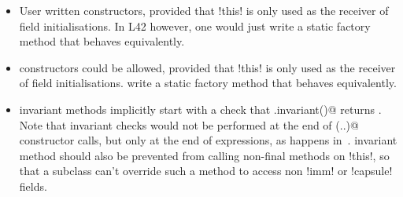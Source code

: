 \begin{itemize}
	\item User written constructors, provided that \Q!this! is only used as the receiver of field initialisations. In L42 however, one would just write a static factory method that behaves equivalently.
	\item {}  constructors could be allowed, provided that \Q!this! is only used as the receiver of field initialisations.   write a static factory method that behaves equivalently.
	\item {} invariant methods   implicitly start with a check that \Q@super.invariant()@ returns \Q@true@. Note that invariant checks would not be performed at the end of \Q@super(..)@ constructor calls, but only at the end of \Q@new@ expressions, as happens in~\cite{feldman2006jose}.  invariant method should also be prevented from calling non-final methods on \Q!this!, so that a subclass can't override such a method to access non \Q!imm! or \Q!capsule! fields. 
\end{itemize}

